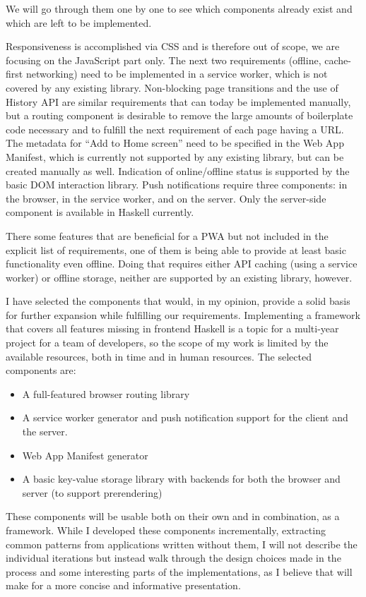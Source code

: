 \documentclass[english,odsaz]{fitthesis}
\begin{document}
We will go through them one by one to see which components already exist and
which are left to be implemented.

Responsiveness is accomplished via CSS and is therefore out of scope, we are
focusing on the JavaScript part only. The next two requirements (offline,
cache-first networking) need to be implemented in a service worker, which is not
covered by any existing library. Non-blocking page transitions and the use of
History API are similar requirements that can today be implemented manually, but
a routing component is desirable to remove the large amounts of boilerplate code
necessary and to fulfill the next requirement of each page having a URL. The
metadata for ``Add to Home screen'' need to be specified in the Web App Manifest,
which is currently not supported by any existing library, but can be created
manually as well. Indication of online/offline status is supported by the basic
DOM interaction library. Push notifications require three components: in the
browser, in the service worker, and on the server. Only the server-side
component is available in Haskell currently.

There some features that are beneficial for a PWA but not included in the
explicit list of requirements, one of them is being able to provide at least
basic functionality even offline. Doing that requires either API caching (using
a service worker) or offline storage, neither are supported by an existing
library, however.

I have selected the components that would, in my opinion, provide a solid basis
for further expansion while fulfilling our requirements. Implementing a
framework that covers all features missing in frontend Haskell is a topic for a
multi-year project for a team of developers, so the scope of my work is limited
by the available resources, both in time and in human resources. The selected
components are:

\begin{itemize}
\item A full-featured browser routing library
\item A service worker generator and push notification support for the client and
the server.
\item Web App Manifest generator
\item A basic key-value storage library with backends for both the browser and
server (to support prerendering)
\end{itemize}

These components will be usable both on their own and in combination, as a
framework. While I developed these components incrementally, extracting common
patterns from applications written without them, I will not describe the
individual iterations but instead walk through the design choices made in the
process and some interesting parts of the implementations, as I believe that
will make for a more concise and informative presentation.
\end{document}
